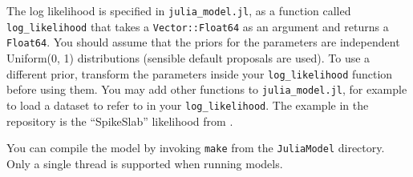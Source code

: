 \documentclass[article]{jss}
\begin{document}
The log likelihood is specified in {\tt julia\_model.jl}, as a function
called {\tt log\_likelihood} that takes a {\tt Vector::Float64} as an argument
and returns a {\tt Float64}. You should assume that the priors for the
parameters are independent Uniform(0, 1) distributions (sensible default
proposals are used). To use a different prior, transform the parameters inside
your {\tt log\_likelihood} function before using them.
You may add other functions to {\tt julia\_model.jl}, for example to load
a dataset to refer to in your {\tt log\_likelihood}. The example in
the repository is the ``SpikeSlab'' likelihood from \citet{dnest}.

You can compile the model by invoking {\tt make}
from the {\tt JuliaModel} directory.
Only a single thread is supported when running 
models.
\end{document}
